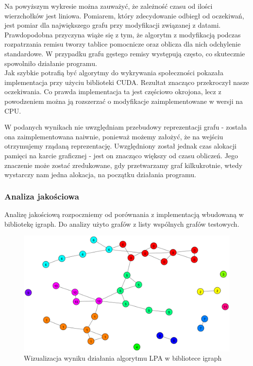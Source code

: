 \documentclass{article}
\begin{document}
Na powyższym wykresie można zauważyć, że zależność czasu od ilości wierzchołków jest liniowa. Pomiarem, który zdecydowanie odbiegł od oczekiwań, jest pomiar dla największego grafu przy modyfikacji związanej z datami. Prawdopodobna przyczyna wiąże się z tym, że algorytm z modyfikacją podczas rozpatrzania remisu tworzy tablice pomocnicze oraz oblicza dla nich odchylenie standardowe. W przypadku grafu gęstego remisy występują często, co skutecznie spowolniło działanie programu.\\

Jak szybkie potrafią być algorytmy do wykrywania społeczności pokazała implementacja przy użyciu biblioteki CUDA. Rezultat znacząco przekroczył nasze oczekiwania. Co prawda implementacja ta jest częściowo okrojona, lecz z powodzeniem można ją rozszerzać o modyfikacje zaimplementowane w wersji na CPU.


W podanych wynikach nie uwzględniam przebudowy reprezentacji grafu - została ona zaimplementowana naiwnie, ponieważ możemy założyć, że na wejściu otrzymujemy rządaną reprezentację. Uwzględniony został jednak czas alokacji pamięci na karcie graficznej - jest on znacząco większy od czasu obliczeń. Jego znaczenie może zostać zredukowane, gdy przetwarzamy graf kilkukrotnie, wtedy wystarczy nam jedna alokacja, na początku działania programu.

\subsubsection{Analiza jakościowa}

Analizę jakościową rozpoczniemy od porównania z implementacją wbudowaną w bibliotekę igraph. Do analizy użyto grafów z listy wspólnych grafów testowych.

\begin{figure}[H]
\centering
\includegraphics[width=\textwidth]{images/ms-build-lpa-0.png}
\caption{Wizualizacja wyniku działania algorytmu LPA w bibliotece igraph}
\end{figure}
\end{document}
